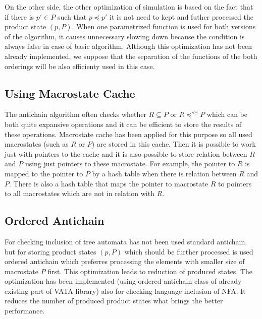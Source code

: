 On the other side, the other optimization of simulation is based on the fact that if there is $p' \in P$ such that $p \preceq p'$ 
it is not need to kept and futher processed the product state $(p,P)$. When one parametrized function is used for both versions of the algorithm, it 
causes unnecessary slowing down because the condition is always false in case of basic algorithm. 
Although this optimization has not been already implemented, we suppose that the separation of the functions of the both orderings will be also 
efficienty used in this case.

\subsection{Using Macrostate Cache}
The antichain algorithm often checks whether $R \subseteq P$ or $R\preceq^{\forall\exists}P$ which can be both quite expansive operations and it can be
efficient to store the results of these operations. Macrostate cache has been applied for this purpose so all used macrostates (such as $R$ or $P$) 
are stored in this cache. Then it is possible to work just with pointers to the cache and it is also possible to store relation between $R$ and $P$ 
using just pointers to these macrostate. For example, 
the pointer to $R$ is mapped to the pointer to $P$ by a hash table when there is relation between $R$ and $P$. There is also a hash table that maps
the pointer to macrostate $R$ to pointers to all macrostates which are not in relation with $R$.

\subsection{Ordered Antichain}
For checking inclusion of tree automata has not been used standard antichain, but for storing product states $(p,P)$ which should be further processed
is used ordered antichain \cite{libvata} which preferres processing the elements with smaller size of macrostate $P$ first. This optimization leads to reduction
of produced states. The optimization has been implemented (using ordered antichain class of already existing part of VATA library) 
also for checking language inclusion of NFA. It reduces the number of produced product states what brings the better performance.


